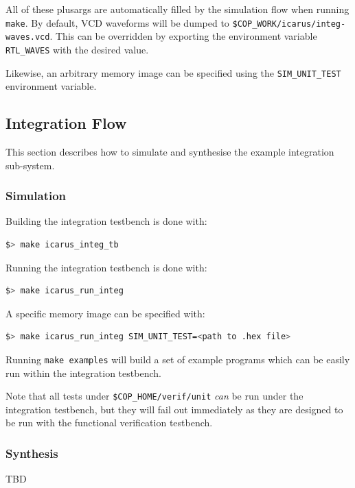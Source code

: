All of these plusargs are automatically filled by the simulation flow
when running {\tt make}.
By default, VCD waveforms will be dumped to
{\tt \$COP\_WORK/icarus/integ-waves.vcd}.
This can be overridden by exporting the environment variable
{\tt RTL\_WAVES} with the desired value.

Likewise, an arbitrary memory image can be specified using the
{\tt SIM\_UNIT\_TEST} environment variable.


\subsection{Integration Flow}

This section describes how to simulate and synthesise the example
integration sub-system.

\subsubsection{Simulation}

Building the integration testbench is done with:
\begin{lstlisting}[language=bash]  
$> make icarus_integ_tb
\end{lstlisting}

Running the integration testbench is done with:

\begin{lstlisting}[language=bash]
$> make icarus_run_integ
\end{lstlisting}

A specific memory image can be specified with:

\begin{lstlisting}[language=bash]
$> make icarus_run_integ SIM_UNIT_TEST=<path to .hex file>
\end{lstlisting}

Running {\tt make examples} will build a set of example programs which can
be easily run within the integration testbench.

Note that all tests under {\tt \$COP\_HOME/verif/unit} {\em can} be run
under the integration testbench, but they will fail out immediately
as they are designed to be run with the functional verification testbench.

\subsubsection{Synthesis}

TBD
